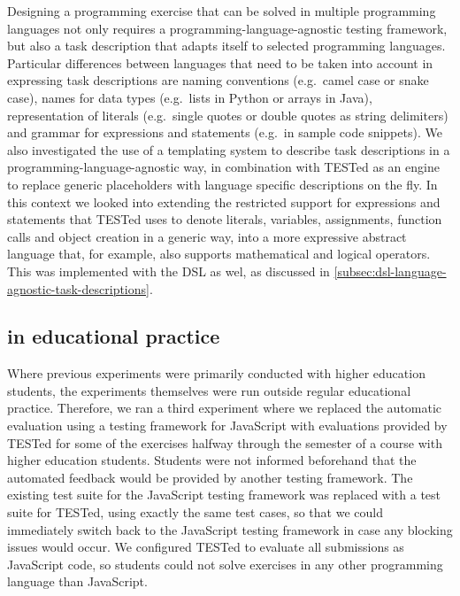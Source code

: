 \documentclass[../main]{subfiles}
\begin{document}
Designing a programming exercise that can be solved in multiple programming languages not only requires a programming-language-agnostic testing framework, but also a task description that adapts itself to selected programming languages.
Particular differences between languages that need to be taken into account in expressing task descriptions are naming conventions (e.g.\ camel case or snake case), names for data types (e.g.\ lists in Python or arrays in Java), representation of literals (e.g.\ single quotes or double quotes as string delimiters) and grammar for expressions and statements (e.g.\ in sample code snippets).
We also investigated the use of a templating system to describe task descriptions in a programming-language-agnostic way, in combination with TESTed as an engine to replace generic placeholders with language specific descriptions on the fly.
In this context we looked into extending the restricted support for expressions and statements that TESTed uses to denote literals, variables, assignments, function calls and object creation in a generic way, into a more expressive abstract language that, for example, also supports mathematical and logical operators.
This was implemented with the DSL as wel, as discussed in \cref{subsec:dsl-language-agnostic-task-descriptions}.

\subsection{\tested{} in educational practice}\label{subsec:tested-in-educational-practice}

Where previous experiments were primarily conducted with higher education students, the experiments themselves were run outside regular educational practice.
Therefore, we ran a third experiment where we replaced the automatic evaluation using a testing framework for JavaScript with evaluations provided by TESTed for some of the exercises halfway through the semester of a course with higher education students.
Students were not informed beforehand that the automated feedback would be provided by another testing framework.
The existing test suite for the JavaScript testing framework was replaced with a test suite for TESTed, using exactly the same test cases, so that we could immediately switch back to the JavaScript testing framework in case any blocking issues would occur.
We configured TESTed to evaluate all submissions as JavaScript code, so students could not solve exercises in any other programming language than JavaScript.
\end{document}
